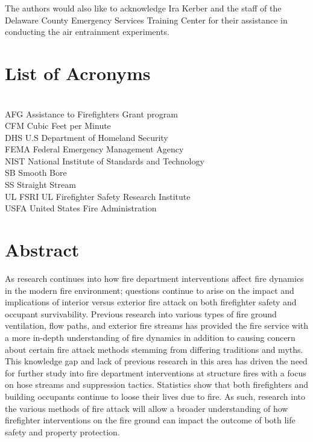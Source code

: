 \documentclass[12pt,oneside]{book}
\begin{document}
The authors would also like to acknowledge Ira Kerber and the staff of the Delaware County Emergency Services Training Center for their assistance in conducting the air entrainment experiments.

\cleardoublepage
{}
{}
\tableofcontents

\cleardoublepage
{}
{}
\listoffigures

\cleardoublepage
{}
{}
\listoftables

\chapter{List of Acronyms}

\begin{tabbing}
\hspace{1.5in} \= \\
AFG \> Assistance to Firefighters Grant program  \\
CFM \> Cubic Feet per Minute \\
DHS \> U.S Department of Homeland Security   \\   
FEMA \> Federal Emergency Management Agency  \\
NIST \> National Institute of Standards and Technology \\
SB \> Smooth Bore \\
SS \> Straight Stream \\
UL FSRI \> UL Firefighter Safety Research Institute \\
USFA \> United States Fire Administration  \\
\end{tabbing}

\newpage

\mainmatter

\chapter*{\centering Abstract}
As research continues into how fire department interventions affect fire dynamics in the modern fire environment; questions continue to arise on the impact and implications of interior versus exterior fire attack on both firefighter safety and occupant survivability. Previous research into various types of fire ground ventilation, flow paths, and exterior fire streams has provided the fire service with a more in-depth understanding of fire dynamics in addition to causing concern about certain fire attack methods stemming from differing traditions and myths. This knowledge gap and lack of previous research in this area has driven the need for further study into fire department interventions at structure fires with a focus on hose streams and suppression tactics. Statistics show that both firefighters and building occupants continue to loose their lives due to fire. As such, research into the various methods of fire attack will allow a broader understanding of how firefighter interventions on the fire ground can impact the outcome of both life safety and property protection. 
\end{document}
